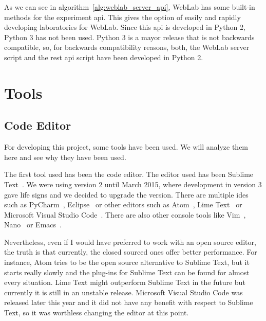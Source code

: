 As we can see in algorithm~\ref{alg:weblab_server_api}, WebLab has some built-in methods for the
experiment \acrshort{api}. This gives the option of easily and rapidly developing laboratories for
WebLab. Since this \acrshort{api} is developed in Python 2, Python 3 has not been used. Python 3 is
a mayor release that is not backwards compatible, so, for backwards compatibility reasons, both, the
WebLab server script and the \acrshort{rest} \acrshort{api} script have been developed in Python 2.

\section{Tools}

\subsection{Code Editor}

For developing this project, some tools have been used. We will analyze them here and see why they
have been used.

The first tool used has been the code editor. The editor used has been Sublime
Text~\cite{sublime_web}. We were using version 2 until March 2015, where development in version 3
gave life signs and we decided to upgrade the version. There are multiple \acrshort{ide}s such as
PyCharm~\cite{pycharm_web}, Eclipse~\cite{eclipse_web} or other editors such as
Atom~\cite{atom_web}, Lime Text~\cite{lime_web} or Microsoft Visual Studio Code~\cite{ms_code_web}.
There are also other console tools like Vim~\cite{vim_web}, Nano~\cite{nano_web} or
Emacs~\cite{emacs_web}.

Nevertheless, even if I would have preferred to work with an open source editor, the truth is that
currently, the closed sourced ones offer better performance. For instance, Atom tries to be the
open source alternative to Sublime Text, but it starts really slowly and the plug-ins for Sublime
Text can be found for almost every situation. Lime Text might outperform Sublime Text in the future
but currently it is still in an unstable release. Microsoft Visual Studio Code was released later
this year and it did not have any benefit with respect to Sublime Text, so it was worthless changing
the editor at this point.

